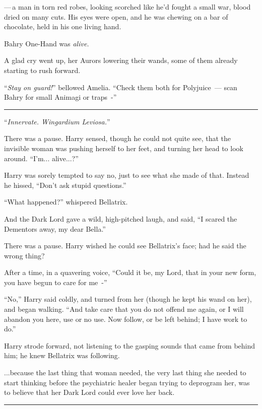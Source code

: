 ---\,a man in torn red robes, looking scorched like he'd fought a small war, blood dried on many cuts. His eyes were open, and he was chewing on a bar of chocolate, held in his one living hand.

Bahry One-Hand was \emph{alive.}

A glad cry went up, her Aurors lowering their wands, some of them already starting to rush forward.

``\emph{Stay on guard!}'' bellowed Amelia. ``Check them both for Polyjuice~--- scan Bahry for small Animagi or traps~-''

\begin{center}\rule{3in}{0.4pt}\end{center}

``\emph{Innervate. Wingardium Leviosa.}''

There was a pause. Harry sensed, though he could not quite see, that the invisible woman was pushing herself to her feet, and turning her head to look around. ``I'm... alive...?''

Harry was sorely tempted to say no, just to see what she made of that. Instead he hissed, ``Don't ask stupid questions.''

``What happened?'' whispered Bellatrix.

And the Dark Lord gave a wild, high-pitched laugh, and said, ``I scared the Dementors away, my dear Bella.''

There was a pause. Harry wished he could see Bellatrix's face; had he said the wrong thing?

After a time, in a quavering voice, ``Could it be, my Lord, that in your new form, you have begun to care for me~-''

``No,'' Harry said coldly, and turned from her (though he kept his wand on her), and began walking. ``And take care that you do not offend me again, or I will abandon you here, use or no use. Now follow, or be left behind; I have work to do.''

Harry strode forward, not listening to the gasping sounds that came from behind him; he knew Bellatrix was following.

...because the last thing that woman needed, the very last thing she needed to start thinking before the psychiatric healer began trying to deprogram her, was to believe that her Dark Lord could ever love her back.

\begin{center}\rule{3in}{0.4pt}\end{center}

